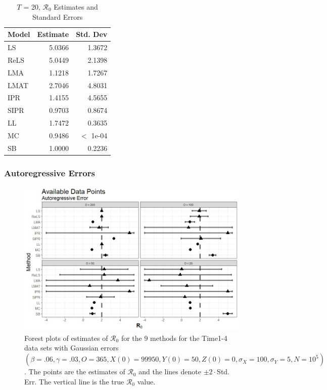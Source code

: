 \documentclass[12pt]{article}
\newcommand{\xxsir}{\ensuremath{9} } %
\newcommand{\rr}{\ensuremath{\mathcal{R}_0}}
\begin{document}
\begin{table}[H]
	\centering
	\begin{tabular}[t]{l|r|r}
		\hline
		Model & Estimate & Std. Dev\\
		\hline
		LS & 5.0366 & 1.3672\\
		\hline
		ReLS & 5.0449 & 2.1398\\
		\hline
		LMA & 1.1218 & 1.7267\\
		\hline
		LMAT & 2.7046 & 4.8031\\
		\hline
		IPR & 1.4155 & 4.5655\\
		\hline
		SIPR & 0.9703 & 0.8674\\
		\hline
		LL & 1.7472 & 0.3635\\
		\hline
		MC & 0.9486 & $<$ 1e-04\\
		\hline
		SB & 1.0000 & 0.2236\\
		\hline
	\end{tabular}
	\caption{$T$ = 20, $\rr$ Estimates and Standard Errors}
\end{table}

\subsubsection{Autoregressive Errors}
\begin{figure}[H]
	\centering
	\includegraphics[scale=0.5]{images/time_ar.jpeg}
	\caption{Forest plots of estimates of $\rr$ for the \xxsir methods for the Time1-4 data sets with Gaussian errors $(\beta=.06, \gamma=.03, O=365, X(0)=99950, Y(0)=50, Z(0)=0, \sigma_X=100, \sigma_Y=5, N=10^5)$.  The points are the estimates of $\rr$ and the lines denote $\pm 2\cdot $Std. Err.  The vertical line is the true $\rr$ value.}
\end{figure}
\end{document}
